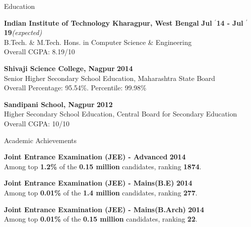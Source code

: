 \documentclass{resume} %
\begin{document}

\begin{rSection}{Education}

{\bf \large Indian Institute of Technology Kharagpur, West Bengal} \hfill \textbf{Jul $^{\prime}$14 - Jul $^{\prime}$19}\textit{(expected)} \\ 
B.Tech. \& M.Tech. Hons. in Computer Science \& Engineering \\
Overall CGPA: 8.19/10

{\bf \large Shivaji Science College, Nagpur} \hfill \textbf{2014} \\ 
Senior Higher Secondary School Education, Maharashtra State Board \\
Overall Percentage: 95.54\%. Percentile: 99.98\%

{\bf \large Sandipani School, Nagpur} \hfill \textbf{2012} \\ 
Higher Secondary School Education, Central Board for Secondary Education \\
Overall CGPA: 10/10

\end{rSection}


\begin{rSection}{Academic Achievements}

{\bf \large Joint Entrance Examination (JEE) - Advanced} \hfill \textbf{2014} \\ 
Among top \textbf{1.2\%} of the \textbf{0.15 million} candidates, ranking \textbf{1874}.

{\bf \large Joint Entrance Examination (JEE) - Mains(B.E)} \hfill \textbf{2014} \\ 
Among top \textbf{0.01\%} of the \textbf{1.4 million} candidates, ranking \textbf{277}.

{\bf \large Joint Entrance Examination (JEE) - Mains(B.Arch)} \hfill \textbf{2014} \\ 
Among top \textbf{0.01\%} of the \textbf{0.15 million} candidates, ranking \textbf{22}.

\end{rSection}
\end{document}
